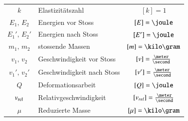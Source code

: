 \begin{tabular}{c l c}
	$k$ 			& Elastizitätszahl 				& $[k] = 1$ 							\\
	$E_1, \,E_2$ 	& Energien vor Stoss 			& $[E] = \joule$ 						\\	
	$E_1', \, E_2'$ & Energien nach Stoss	 		& $[E'] = \joule$ 						\\	
	$m_1, \, m_2$ 	& stossende Massen 				& $[m] = \kilo \gram$ 					\\
	$v_1, \, v_2$ 	& Geschwindigkeit vor Stoss 	& $[v] = \frac{\meter}{\second}$ 		\\
	$v_1', \, v_2'$ & Geschwindigkeit nach Stoss 	& $[v'] = \frac{\meter}{\second}$ 		\\
	$Q$ 			& Deformationsarbeit 			& $[Q] = \joule$ 						\\
	$v_{\rm rel}$ 	& Relativgeschwindigkeit 		& $[v_{rel}] = \frac{\meter}{\second}$ 	\\
	$\mu$ 			& Reduzierte Masse 				& $[\mu] = \kilo \gram$ 
\end{tabular}


\pagebreak